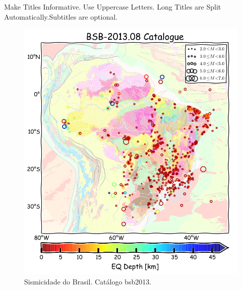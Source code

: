 \documentclass[ucs,8pt]{beamer}
\begin{document}
\begin{frame}{Make Titles Informative. Use Uppercase Letters. Long Titles are Split Automatically.}{Subtitles are optional.}

	\begin{figure}[H]
	  \centering
	  \includegraphics[height=.90\textheight]{seismicity_br} 
	  \caption{Sismicidade do Brasil. Catálogo \gls{bsb2013}.}
	  \label{fig:br_seis} 
	\end{figure}


\end{frame}
\end{document}
